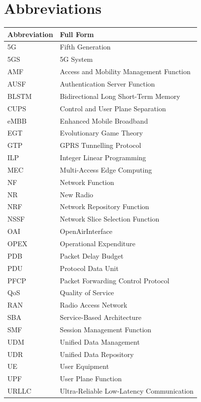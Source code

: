 \documentclass[conference]{IEEEtran}
\begin{document}
\section*{Abbreviations}
\begin{center}
\renewcommand{\arraystretch}{1.1}
\begin{tabular}{ll}
\hline
\textbf{Abbreviation} & \textbf{Full Form} \\
\hline
5G      & Fifth Generation \\
5GS     & 5G System \\
AMF     & Access and Mobility Management Function \\
AUSF    & Authentication Server Function \\
BLSTM   & Bidirectional Long Short-Term Memory \\
CUPS    & Control and User Plane Separation \\
eMBB    & Enhanced Mobile Broadband \\
EGT     & Evolutionary Game Theory \\
GTP     & GPRS Tunnelling Protocol \\
ILP     & Integer Linear Programming \\
MEC     & Multi-Access Edge Computing \\
NF      & Network Function \\
NR      & New Radio \\
NRF     & Network Repository Function \\
NSSF    & Network Slice Selection Function \\
OAI     & OpenAirInterface \\
OPEX    & Operational Expenditure \\
PDB     & Packet Delay Budget \\
PDU     & Protocol Data Unit \\
PFCP    & Packet Forwarding Control Protocol \\
QoS     & Quality of Service \\
RAN     & Radio Access Network \\
SBA     & Service-Based Architecture \\
SMF     & Session Management Function \\
UDM     & Unified Data Management \\
UDR     & Unified Data Repository \\
UE      & User Equipment \\
UPF     & User Plane Function \\
URLLC   & Ultra-Reliable Low-Latency Communication \\
\hline
\end{tabular}
\end{center}
\end{document}
